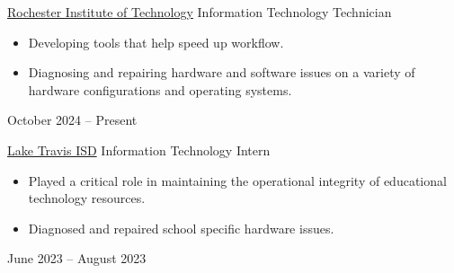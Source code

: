 \documentclass[10pt,letterpaper]{altacv}
\begin{document}
\tagline{
\seeking
}
\photo{6cm}{}

\makecvheader

 


\medskip



\cvexperience
    {\href{https://www.rit.edu/}{Rochester Institute of Technology}}
    {Information Technology Technician}
    {
        \begin{itemize}
            \item Developing tools that help speed up workflow.
            \item Diagnosing and repairing hardware and software issues on a variety of hardware configurations and operating systems.
        \end{itemize}
    }
        {October 2024 -- Present}

\cvexperience
    {\href{https://www.ltisdschools.org/}{Lake Travis ISD}}
    {Information Technology Intern}
    {
        \begin{itemize}
            \item Played a critical role in maintaining the operational integrity of educational technology resources.
            \item Diagnosed and repaired school specific hardware issues.
        \end{itemize}
    }
        {June 2023 -- August 2023}
\end{document}
